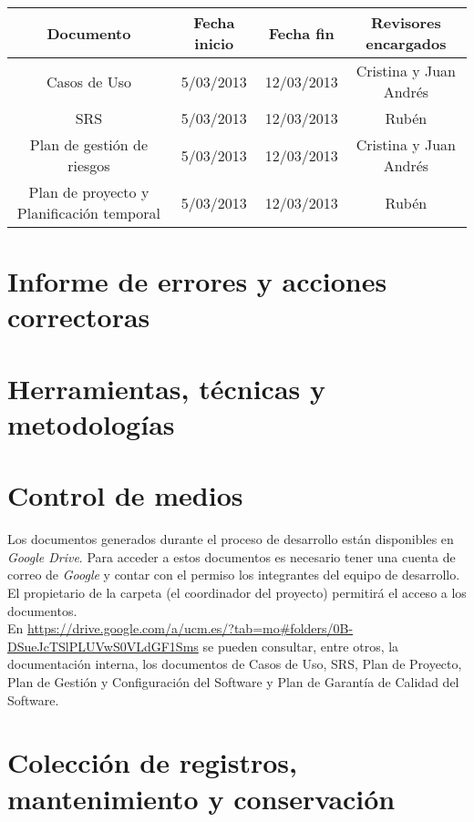\documentclass[11pt, a4paper, twoside, titlepage]{article}
\begin{document}
			\begin{center}
				\begin{tabular}{|c |c |c |c |}
				\hline
				\textbf{Documento} & \textbf{Fecha inicio} & \textbf{Fecha fin} &\textbf{Revisores encargados}\\
				\hline
				Casos de Uso & 5/03/2013 & 12/03/2013 & Cristina y Juan Andrés\\
				\hline
				SRS & 5/03/2013 & 12/03/2013 & Rubén\\
				\hline
				Plan de gestión de riesgos & 5/03/2013 & 12/03/2013 & Cristina y Juan Andrés\\
				\hline
				Plan de proyecto y Planificación temporal & 5/03/2013 & 12/03/2013 & Rubén\\
				\hline
				\end{tabular}
			\end{center}
		
	\section{Informe de errores y acciones correctoras}%
		
	\section{Herramientas, técnicas y metodologías}%
	\section{Control de medios}%
		Los documentos generados durante el proceso de desarrollo están disponibles en \textit{Google Drive}. Para acceder a estos documentos es necesario tener una cuenta de correo de \textit{Google} y contar con el permiso los integrantes del equipo de desarrollo. El propietario de la carpeta (el coordinador del proyecto) permitirá el acceso a los documentos. \\
		En \url{https://drive.google.com/a/ucm.es/?tab=mo#folders/0B-DSueJcTSlPLUVwS0VLdGF1Sms} se pueden consultar, entre otros, la documentación interna, los documentos de Casos de Uso, SRS, Plan de Proyecto, Plan de Gestión y Configuración del Software y Plan de Garantía de Calidad del Software.

	\section{Colección de registros, mantenimiento y conservación}%
\end{document}
